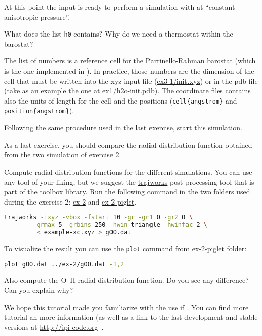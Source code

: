 \documentclass{article}
\begin{document}
\begin{Exercise}[label={inputs},title={PIMD-NPT simulation of ice}]
At this point the input is ready to perform a simulation with at
``constant anisotropic pressure''.

\Question
What does the list \texttt{h0} contains? Why do we need a thermostat
within the barostat?

The list of numbers is a reference cell for the Parrinello-Rahman
barostat (which is the one implemented in \ipi). In practice, those
numbers are the dimension of the cell that must be written into the xyz
input file (\url{ex3-1/init.xyz}) or in the pdb file (take as an
example the one at \url{ex1/h2o-init.pdb}). The coordinate files
contains also the units of length for the cell and the positions
(\texttt{cell\{angstrom\}} and \texttt{position\{angstrom\}}).

\Question
Following the same procedure used in the last exercise, start this
simulation.

\end{Exercise}

\begin{Exercise}[label={inputs},title={Radial distribution function comparison}]
As a last exercise, you should compare the radial distribution
function obtained from the two simulation of exercise 2.

\Question
Compute radial distribution functions for the different simulations. You
can use any tool of your liking, but we suggest the \url{trajworks}
post-processing tool that is part of the \url{toolbox} library.
Run the following command in the two folders used during the exercise
2: \url{ex-2} and \url{ex-2-piglet}.
\begin{lstlisting}[language=bash]
trajworks -ixyz -vbox -fstart 10 -gr -gr1 O -gr2 O \
        -grmax 5 -grbins 250 -hwin triangle -hwinfac 2 \
         < example-xc.xyz > gOO.dat
\end{lstlisting}

To visualize the result you can use the \texttt{plot} command from
\url{ex-2-piglet} folder:
\begin{lstlisting}[language=bash]
plot gOO.dat ../ex-2/gOO.dat -1,2
\end{lstlisting}
Also compute the O--H radial distribution function.
Do you see any difference? Can you explain why?

\end{Exercise}

We hope this tutorial made you familiarize with the use if \ipi. You
can find more tutorial an more information (as well as a link to the
last development and stable versions at \url{http://ipi-code.org}~\cite{CP2K}.
\end{document}
